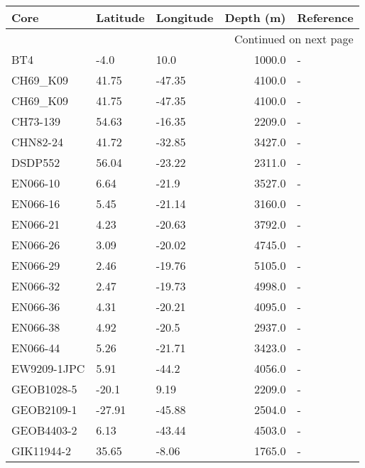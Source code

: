 \begin{longtable}{lllrl}

             Core & Latitude & Longitude &  Depth (m) & Reference \\

\endhead

\multicolumn{5}{r}{{Continued on next page}} \\

\endfoot


\endlastfoot
              BT4 &     -4.0 &      10.0 &     1000.0 &         - \\
         CH69\_K09 &    41.75 &    -47.35 &     4100.0 &         - \\
         CH69\_K09 &    41.75 &    -47.35 &     4100.0 &         - \\
         CH73-139 &    54.63 &    -16.35 &     2209.0 &         - \\
         CHN82-24 &    41.72 &    -32.85 &     3427.0 &         - \\
          DSDP552 &    56.04 &    -23.22 &     2311.0 &         - \\
         EN066-10 &     6.64 &     -21.9 &     3527.0 &         - \\
         EN066-16 &     5.45 &    -21.14 &     3160.0 &         - \\
         EN066-21 &     4.23 &    -20.63 &     3792.0 &         - \\
         EN066-26 &     3.09 &    -20.02 &     4745.0 &         - \\
         EN066-29 &     2.46 &    -19.76 &     5105.0 &         - \\
         EN066-32 &     2.47 &    -19.73 &     4998.0 &         - \\
         EN066-36 &     4.31 &    -20.21 &     4095.0 &         - \\
         EN066-38 &     4.92 &     -20.5 &     2937.0 &         - \\
         EN066-44 &     5.26 &    -21.71 &     3423.0 &         - \\
      EW9209-1JPC &     5.91 &     -44.2 &     4056.0 &         - \\
       GEOB1028-5 &    -20.1 &      9.19 &     2209.0 &         - \\
       GEOB2109-1 &   -27.91 &    -45.88 &     2504.0 &         - \\
       GEOB4403-2 &     6.13 &    -43.44 &     4503.0 &         - \\
       GIK11944-2 &    35.65 &     -8.06 &     1765.0 &         - \\

\end{longtable}

